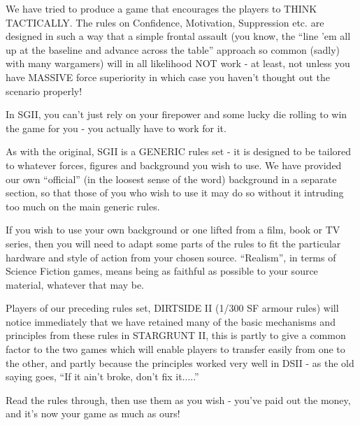 We have tried to produce a game that encourages the players to THINK TACTICALLY. The rules on Confidence, Motivation, Suppression etc. are designed in such a way that a simple frontal assault (you know, the ``line 'em all up at the baseline and advance across the table'' approach so common (sadly) with many wargamers) will in all likelihood NOT work - at least, not unless you have MASSIVE force superiority in which case you haven't thought out the scenario properly!

In SGII, you can't just rely on your firepower and some lucky die rolling to win the game for you - you actually have to work for it.

As with the original, SGII is a GENERIC rules set - it is designed to be tailored to whatever forces, figures and background you wish to use. We have provided our own ``official'' (in the loosest sense of the word) background in a separate section, so that those of you who wish to use it may do so without it intruding too much on the main generic rules.

If you wish to use your own background or one lifted from a film, book or TV series, then you will need to adapt some parts of the rules to fit the particular hardware and style of action from your chosen source. ``Realism'', in terms of Science Fiction games, means being as faithful as possible to your source material, whatever that may be.

Players of our preceding rules set, DIRTSIDE II (1/300 SF armour rules) will notice immediately that we have retained many of the basic mechanisms and principles from these rules in STARGRUNT II, this is partly to give a common factor to the two games which will enable players to transfer easily from one to the other, and partly because the principles worked very well in DSII - as the old saying goes, ``If it ain't broke, don't fix it.....''

Read the rules through, then use them as you wish - you've paid out the money, and it's now your game as much as ours!


